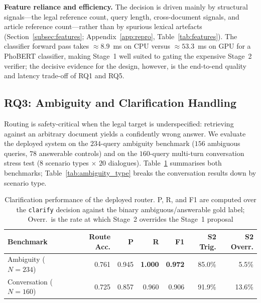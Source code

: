 \documentclass[pdflatex,sn-mathphys-num]{sn-jnl}
\begin{document}
\noindent\textbf{Feature reliance and efficiency.} The decision is driven
mainly by structural signals---the legal reference count, query length,
cross-document signals, and article reference count---rather than by spurious
lexical artefacts (Section~\ref{subsec:features};
Appendix~\ref{app:repro}, Table~\ref{tab:features}). The classifier forward
pass takes $\approx\!8.9$~ms on CPU versus $\approx\!53.3$~ms on GPU for a
PhoBERT classifier, making Stage~1 well suited to gating the expensive
Stage~2 verifier; the decisive evidence for the design, however, is the
end-to-end quality and latency trade-off of RQ1 and RQ5.

\subsection{RQ3: Ambiguity and Clarification Handling}\label{subsec:rq3}

Routing is safety-critical when the legal target is underspecified: retrieving
against an arbitrary document yields a confidently wrong answer. We evaluate
the deployed system on the $234$-query ambiguity benchmark ($156$ ambiguous
queries, $78$ answerable controls) and on the $160$-query multi-turn
conversation stress test ($8$ scenario types $\times$ $20$ dialogues).
Table~\ref{tab:ambiguity} summarises both benchmarks;
Table~\ref{tab:ambiguity_type} breaks the conversation results down by
scenario type.

\begin{table}[!htbp]
\centering
\caption{Clarification performance of the deployed router. P, R, and F1 are
computed over the \texttt{clarify} decision against the binary
ambiguous/answerable gold label; Overr.\ is the rate at which Stage~2
overrides the Stage~1 proposal}\label{tab:ambiguity}
\scriptsize
\setlength{\tabcolsep}{3pt}
\begin{tabular}{lrrrrrr}
\toprule
\textbf{Benchmark} & \textbf{Route Acc.} & \textbf{P} & \textbf{R} & \textbf{F1} & \textbf{S2 Trig.} & \textbf{S2 Overr.} \\
\midrule
Ambiguity ($N{=}234$)    & 0.761 & 0.945 & \textbf{1.000} & \textbf{0.972} & 85.0\% & 5.5\% \\
Conversation ($N{=}160$) & 0.725 & 0.857 & 0.960 & 0.906 & 91.9\% & 13.6\% \\
\bottomrule
\end{tabular}
\end{table}
\end{document}
